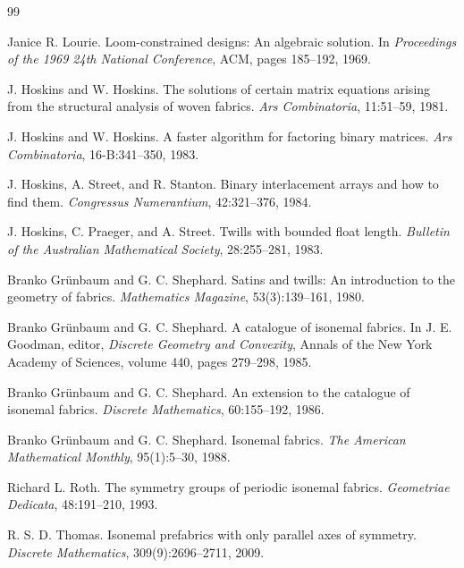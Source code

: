 \documentclass[11pt]{article}
\begin{document}
\clearpage
\begin{thebibliography}{99}

Janice R. Lourie.
\newblock Loom-constrained designs: An algebraic solution.
\newblock In \emph{Proceedings of the 1969 24th National Conference}, ACM,
pages 185--192, 1969.

J. Hoskins and W. Hoskins.
\newblock The solutions of certain matrix equations arising from the structural
analysis of woven fabrics.
\newblock \emph{Ars Combinatoria}, 11:51--59, 1981.

J. Hoskins and W. Hoskins.
\newblock A faster algorithm for factoring binary matrices.
\newblock \emph{Ars Combinatoria}, 16-B:341--350, 1983.

J. Hoskins, A. Street, and R. Stanton.
\newblock Binary interlacement arrays and how to find them.
\newblock \emph{Congressus Numerantium}, 42:321--376, 1984.

J. Hoskins, C. Praeger, and A. Street.
\newblock Twills with bounded float length.
\newblock \emph{Bulletin of the Australian Mathematical Society}, 28:255--281,
1983.

Branko Gr\"unbaum and G. C. Shephard.
\newblock Satins and twills: An introduction to the geometry of fabrics.
\newblock \emph{Mathematics Magazine}, 53(3):139--161, 1980.

Branko Gr\"unbaum and G. C. Shephard.
\newblock A catalogue of isonemal fabrics.
\newblock In J. E. Goodman, editor, \emph{Discrete Geometry and Convexity},
Annals of the New York Academy of Sciences, volume 440, pages 279--298, 1985.

Branko Gr\"unbaum and G. C. Shephard.
\newblock An extension to the catalogue of isonemal fabrics.
\newblock \emph{Discrete Mathematics}, 60:155--192, 1986.

Branko Gr\"unbaum and G. C. Shephard.
\newblock Isonemal fabrics.
\newblock \emph{The American Mathematical Monthly}, 95(1):5--30, 1988.

Richard L. Roth.
\newblock The symmetry groups of periodic isonemal fabrics.
\newblock \emph{Geometriae Dedicata}, 48:191--210, 1993.

R. S. D. Thomas.
\newblock Isonemal prefabrics with only parallel axes of symmetry.
\newblock \emph{Discrete Mathematics}, 309(9):2696--2711, 2009.


\end{thebibliography}
\end{document}
